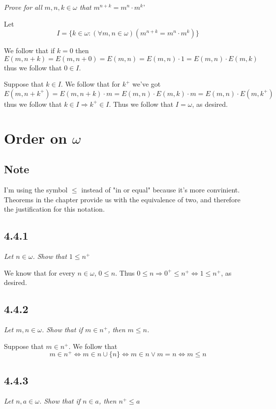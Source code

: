 \documentclass[11pt,oneside,titlepage]{book}
\DeclareMathOperator \lra {\Leftrightarrow}
\DeclareMathOperator \ra {\Rightarrow}
\begin{document}
\textit{Prove for all $m, n, k \in \omega$ that $m^{n + k} = m^n \cdot m^k$}'

Let
$$I = \{k \in \omega: (\forall m, n \in \omega)(m^{n + k} = m^n \cdot m^k)\}$$

We follow that if $k = 0$ then
$$E(m, n + k) = E(m, n + 0) = E(m, n) = E(m, n) \cdot 1 = E(m, n) \cdot E(m, k)$$
thus we follow that $0 \in I$.

Suppose that $k \in I$. We follow that for $k^+$ we've got
$$E(m, n + k^+) = E(m, n + k) \cdot m = E(m, n) \cdot E(m, k) \cdot m =
E(m, n) \cdot E(m, k^+)$$
thus we follow that $k \in I \ra k^+ \in I$. Thus we follow that $I = \omega$, as desired.


\section{Order on $\omega$}

\subsection*{Note}

I'm using the symbol $\leq$ instead of "in or equal" because it's more convinient.
Theorems in the chapter provide us with the equivalence of two, and therefore the justification
for this notation.

\subsection*{4.4.1}

\textit{Let $n \in \omega$. Show that $1 \leq n^+$}

We know that for every $n \in \omega$, $0 \leq n$.
Thus $0 \leq n \ra 0^+ \leq n^+ \lra 1 \leq n^+$, as desired.

\subsection*{4.4.2}

\textit{Let $m, n \in \omega$. Show that if $m \in n^+$, then $m \leq n$.}

Suppose that $m \in n^+$. We follow that
$$m \in n^+ \lra m \in n \cup \{n\} \lra m \in n \lor m = n \lra m \leq n$$


\subsection*{4.4.3}

\textit{Let $n, a \in \omega$. Show that if $n \in a$, then $n^+ \leq a$}
\end{document}
